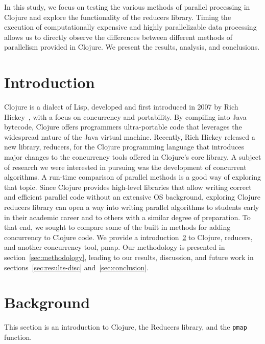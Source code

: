 \documentclass[12pt]{article}
\newcommand{\comment}[1]{{\bf \tt  {#1}}}
\newcommand{\emcomment}[1]{\textcolor{ForestGreen}{\comment{Elena: {#1}}}}
\newcommand{\clocode}[1]{{\texttt {#1}}}
\begin{document}
In this study, we focus on testing the various methods of parallel processing in Clojure and explore the functionality of the reducers library. Timing the execution of computationally expensive and highly parallelizable data processing allows us to directly observe the differences between different methods of parallelism provided in Clojure. We present the results, analysis, and conclusions.


 \newpage

\setcounter{page}{1}


\section{Introduction}\label{sec:intro}

	 Clojure is a dialect of Lisp, developed and first introduced in 2007 by Rich Hickey~\cite{Hickey:2008}, with a focus on concurrency and portability. By compiling into Java bytecode, Clojure offers programmers ultra-portable code that leverages the widespread nature of the Java virtual machine. Recently, Rich Hickey released a new library, reducers, for the Clojure programming language that introduces major changes to the concurrency tools offered in Clojure's core library. A subject of research we were interested in pursuing was the development of concurrent algorithms. A run-time comparison of parallel methods is a good way of exploring that topic. Since Clojure provides high-level libraries that allow writing correct and efficient parallel code without an extensive OS background, exploring Clojure reducers library can open a way into writing parallel algorithms to students early in their academic career and to others with a similar degree of preparation. 
To that end, we sought to compare some of the built in methods for adding concurrency to Clojure code. We provide a introduction~\ref{sec:background} to Clojure, reducers, and another concurrency tool, pmap. Our methodology is presented in section~\ref{sec:methodology}, leading to our results, discussion, and future work in sections~\ref{sec:results-disc} and~\ref{sec:conclusion}.



\section{Background}\label{sec:background}
This section is an introduction to Clojure, the Reducers library, and the \clocode{pmap} function. 
\end{document}
